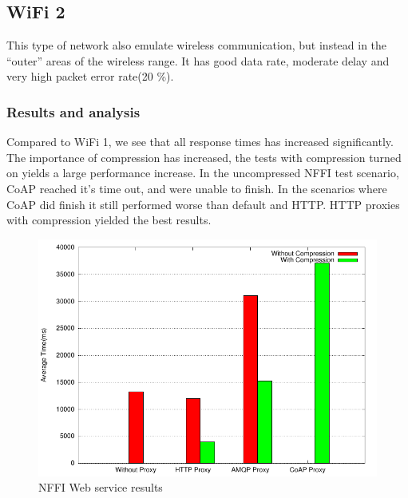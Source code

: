 \subsection{WiFi 2}

This type of network also emulate wireless communication, but instead in the
``outer'' areas of the wireless range. It has good data rate, moderate delay
and very high packet error rate(20 \%).


\subsubsection{Results and analysis}

Compared to WiFi 1, we see that all response times has increased
significantly. The importance of compression has increased, the tests with
compression turned on yields a large performance increase. In the uncompressed
NFFI test scenario, CoAP reached it's time out, and were unable to finish. In
the scenarios where CoAP did finish it still performed worse than default and
HTTP. HTTP proxies with compression yielded the best results.

\begin{figure}[H]
\center
\includegraphics[scale=0.75]{../results/wifi2/nffi/result.pdf}
\caption{NFFI Web service results}
\end{figure}

